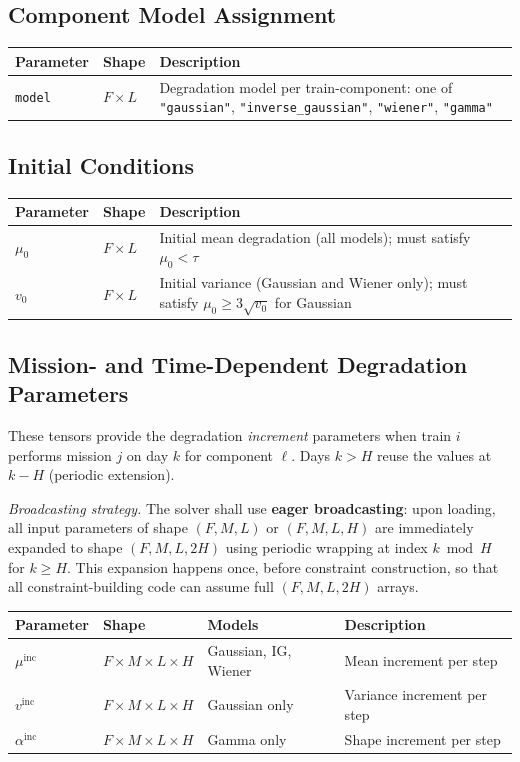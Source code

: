 \documentclass[11pt,a4paper]{article}
\begin{document}
\subsection{Component Model Assignment}

\begin{longtable}{@{}llp{8cm}@{}}
\toprule
Parameter & Shape & Description \\
\midrule
\texttt{model} & $F \times L$ & Degradation model per train-component:
  one of \texttt{"gaussian"}, \texttt{"inverse\_gaussian"},
  \texttt{"wiener"}, \texttt{"gamma"} \\
\bottomrule
\end{longtable}

\subsection{Initial Conditions}

\begin{longtable}{@{}llp{8cm}@{}}
\toprule
Parameter & Shape & Description \\
\midrule
$\mu_0$ & $F \times L$ & Initial mean degradation (all models); must satisfy $\mu_0 < \tau$ \\
$v_0$ & $F \times L$ & Initial variance (Gaussian and Wiener only); must satisfy
  $\mu_0 \geq 3\sqrt{v_0}$ for Gaussian \\
\bottomrule
\end{longtable}

\subsection{Mission- and Time-Dependent Degradation Parameters}

These tensors provide the degradation \emph{increment} parameters when train $i$
performs mission $j$ on day $k$ for component $\ell$.
Days $k > H$ reuse the values at $k - H$ (periodic extension).

\emph{Broadcasting strategy.}
The solver shall use \textbf{eager broadcasting}: upon loading, all input parameters
of shape $(F, M, L)$ or $(F, M, L, H)$ are immediately expanded to shape
$(F, M, L, 2H)$ using periodic wrapping at index $k \bmod H$ for $k \geq H$.
This expansion happens once, before constraint construction, so that all
constraint-building code can assume full $(F, M, L, 2H)$ arrays.

\begin{longtable}{@{}lllp{5cm}@{}}
\toprule
Parameter & Shape & Models & Description \\
\midrule
$\mu^{\mathrm{inc}}$ & $F \times M \times L \times H$ & Gaussian, IG, Wiener
  & Mean increment per step \\
$v^{\mathrm{inc}}$ & $F \times M \times L \times H$ & Gaussian only
  & Variance increment per step \\
$\alpha^{\mathrm{inc}}$ & $F \times M \times L \times H$ & Gamma only
  & Shape increment per step \\
\bottomrule
\end{longtable}
\end{document}
